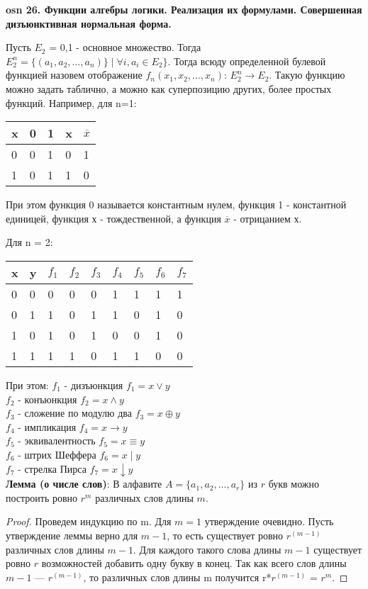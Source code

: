 \textbf{\LARGE osn 26. Функции алгебры логики. Реализация их формулами. Совершенная дизъюнктивная нормальная форма.}

Пусть $E_{2}$ = {0,1} - основное множество. Тогда $E^n_{2} = \{(a_{1}, a_{2}, \ldots, a_{n}) \} \mid \forall i, a_{i} \in E_{2}\}$. Тогда всюду определенной булевой функцией назовем отображение $f_{n}(x_{1}, x_{2}, \ldots, x_{n})$: $E^n_{2} \rightarrow E_{2}$. Такую функцию можно задать таблично, а можно как суперпозицию других, более простых функций. Например, для n=1: \\

\begin{tabular}{ l | l l l l}
x & 0 & 1 & x & $\overline{x}$ \\
\hline
0 & 0 & 1 & 0 & 1\\
1 & 0 & 1 & 1 & 0\\
\end{tabular}


При этом функция 0 называется константным нулем, функция 1 - константной единицей, функция х - тождественной, а функция $\overline{x}$ - отрицанием х.  

Для n = 2: \\
\begin{tabular}{ l l | l l l l l l l}
x & y & $f_{1}$ & $f_{2}$ & $f_{3}$ & $f_{4}$ & $f_{5}$ & $f_{6}$ & $f_{7}$ \\
\hline
0 & 0 & 0 & 0 & 0 & 1 & 1 & 1 & 1 \\
0 & 1 & 1 & 0 & 1 & 1 & 0 & 1 & 0 \\
1 & 0 & 1 & 0 & 1 & 0 & 0 & 1 & 0 \\
1 & 1 & 1 & 1 & 0 & 1 & 1 & 0 & 0 \\
\end{tabular}

При этом: 
$f_{1}$ - дизъюнкция $f_{1} = x \vee y$\\
$f_{2}$ - конъюнкция $f_{2} = x \wedge y$ \\
$f_{3}$ - сложение по модулю два $f_{3} = x \oplus y$ \\
$f_{4}$ - импликация $f_{4} = x \rightarrow y$ \\
$f_{5}$ - эквивалентность $f_{5} = x \equiv y$\\
$f_{6}$ - штрих Шеффера $f_{6} = x \mid y$ \\
$f_{7}$ - стрелка Пирса $f_{7} = x \downarrow y$ \\

\textbf{Лемма (о числе слов)}: В алфавите $A = \{a_{1}, a_{2}, \ldots, a_{r}\}$ из $r$ букв можно построить ровно $r^m$ различных слов длины $m$. \\
\begin{proof}
Проведем индукцию по m. Для $m = 1$ утверждение очевидно. Пусть утверждение леммы верно для $m - 1$, то есть существует ровно $r^{(m-1)}$ различных слов длины $m - 1$. Для каждого такого слова длины $m-1$ существует ровно $r$ возможностей добавить одну букву в конец. Так как всего слов длины $m-1$ --- $r^{(m-1)}$, то различных слов длины m получится r*$r^{(m-1)}$ = $r^m$. 
\end{proof}


